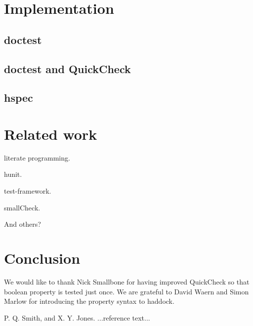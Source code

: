 \documentclass[preprint]{sigplanconf}
\begin{document}
\section{Implementation}

\subsection{doctest}

\subsection{doctest and QuickCheck}

\subsection{hspec}

\section{Related work}

literate programming.

hunit.

test-framework.

smallCheck.

And others?

\section{Conclusion}



\acks

We would like to thank
Nick Smallbone for having improved QuickCheck so that boolean property is tested
just once.
We are grateful to David Waern and Simon Marlow
for introducing the property syntax to haddock.






\begin{thebibliography}{}
\softraggedright

P. Q. Smith, and X. Y. Jones. ...reference text...

\end{thebibliography}
\end{document}
